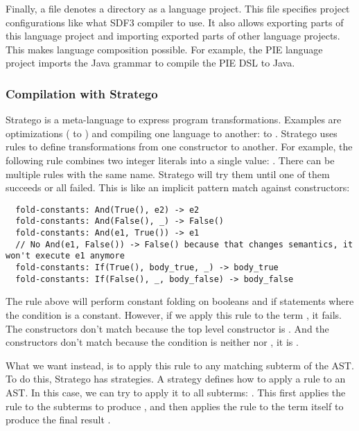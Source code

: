 Finally, a  file denotes a directory as a language project.
This file specifies project configurations like what \ac{SDF3} compiler to use.
It also allows exporting parts of this language project and importing exported parts of other language projects.
This makes language composition possible.
For example, the \ac{PIE} language project imports the Java grammar to compile the \ac{PIE} \ac{DSL} to Java.

\subsubsection{Compilation with Stratego}
\label{subsubsec:problem_analysis__background__stratego}

Stratego is a meta-language to express program transformations.
Examples are optimizations ( to ) and compiling one language to another:  to .
Stratego uses rules to define transformations from one constructor to another.
For example, the following rule combines two integer literals into a single value: .
There can be multiple rules with the same name.
Stratego will try them until one of them succeeds or all failed.
This is like an implicit pattern match against constructors:
\begin{lstlisting}
  fold-constants: And(True(), e2) -> e2
  fold-constants: And(False(), _) -> False()
  fold-constants: And(e1, True()) -> e1
  // No And(e1, False()) -> False() because that changes semantics, it won't execute e1 anymore
  fold-constants: If(True(), body_true, _) -> body_true
  fold-constants: If(False(), _, body_false) -> body_false
\end{lstlisting}

The  rule above will perform constant folding on booleans and if statements where the condition is a constant.
However, if we apply this rule to the term , it fails.
The  constructors don't match because the top level constructor is .
And the  constructors don't match because the condition is neither  nor , it is .

What we want instead, is to apply this rule to any matching subterm of the \ac{AST}.
To do this, Stratego has strategies.
A strategy defines how to apply a rule to an \ac{AST}.
In this case, we can try to apply it to all subterms: .
This first applies the rule to the subterms to produce , and then applies the rule to the term itself to produce the final result .

